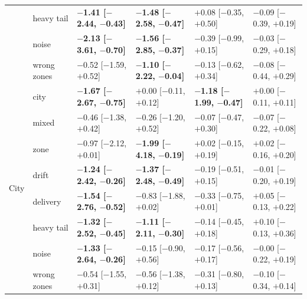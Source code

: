 \begin{tabular}{llllll}
 & heavy tail & \textbf{$-$1.41 [$-$2.44, $-$0.43]} & \textbf{$-$1.48 [$-$2.58, $-$0.47]} & $+$0.08 [$-$0.35, $+$0.50] & $-$0.09 [$-$0.39, $+$0.19] \\
 & noise & \textbf{$-$2.13 [$-$3.61, $-$0.70]} & \textbf{$-$1.56 [$-$2.85, $-$0.37]} & $-$0.39 [$-$0.99, $+$0.15] & $-$0.03 [$-$0.29, $+$0.18] \\
 & wrong zones & $-$0.52 [$-$1.59, $+$0.52] & \textbf{$-$1.10 [$-$2.22, $-$0.04]} & $-$0.13 [$-$0.62, $+$0.34] & $-$0.08 [$-$0.44, $+$0.29] \\
\midrule
\multirow{8}{*}{City} & city & \textbf{$-$1.67 [$-$2.67, $-$0.75]} & $+$0.00 [$-$0.11, $+$0.12] & \textbf{$-$1.18 [$-$1.99, $-$0.47]} & $+$0.00 [$-$0.11, $+$0.11] \\
 & mixed & $-$0.46 [$-$1.38, $+$0.42] & $-$0.26 [$-$1.20, $+$0.52] & $-$0.07 [$-$0.47, $+$0.30] & $-$0.07 [$-$0.22, $+$0.08] \\
 & zone & $-$0.97 [$-$2.12, $+$0.01] & \textbf{$-$1.99 [$-$4.18, $-$0.19]} & $+$0.02 [$-$0.15, $+$0.19] & $+$0.02 [$-$0.16, $+$0.20] \\
 & drift & \textbf{$-$1.24 [$-$2.42, $-$0.26]} & \textbf{$-$1.37 [$-$2.48, $-$0.49]} & $-$0.19 [$-$0.51, $+$0.15] & $-$0.01 [$-$0.20, $+$0.19] \\
 & delivery & \textbf{$-$1.54 [$-$2.76, $-$0.52]} & $-$0.83 [$-$1.88, $+$0.02] & $-$0.33 [$-$0.75, $+$0.01] & $+$0.05 [$-$0.13, $+$0.22] \\
 & heavy tail & \textbf{$-$1.32 [$-$2.52, $-$0.45]} & \textbf{$-$1.11 [$-$2.11, $-$0.30]} & $-$0.14 [$-$0.45, $+$0.18] & $+$0.10 [$-$0.13, $+$0.36] \\
 & noise & \textbf{$-$1.33 [$-$2.64, $-$0.26]} & $-$0.15 [$-$0.90, $+$0.56] & $-$0.17 [$-$0.56, $+$0.17] & $-$0.00 [$-$0.22, $+$0.19] \\
 & wrong zones & $-$0.54 [$-$1.55, $+$0.31] & $-$0.56 [$-$1.38, $+$0.12] & $-$0.31 [$-$0.80, $+$0.13] & $-$0.10 [$-$0.34, $+$0.14] \\
\bottomrule
\end{tabular}
